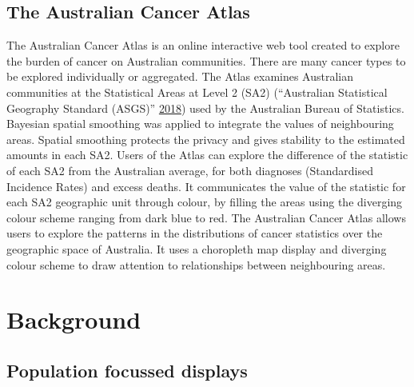 \documentclass[conference,final,]{IEEEtran}
\begin{document}
\hypertarget{the-australian-cancer-atlas}{%
\subsection{The Australian Cancer
Atlas}\label{the-australian-cancer-atlas}}

The Australian Cancer Atlas is an online interactive web tool created to
explore the burden of cancer on Australian communities. There are many
cancer types to be explored individually or aggregated. The Atlas
examines Australian communities at the Statistical Areas at Level 2
(SA2) (``Australian Statistical Geography Standard (ASGS)''
\protect\hyperlink{ref-abs2016}{2018}) used by the Australian Bureau of
Statistics. Bayesian spatial smoothing was applied to integrate the
values of neighbouring areas. Spatial smoothing protects the privacy and
gives stability to the estimated amounts in each SA2. Users of the Atlas
can explore the difference of the statistic of each SA2 from the
Australian average, for both diagnoses (Standardised Incidence Rates)
and excess deaths. It communicates the value of the statistic for each
SA2 geographic unit through colour, by filling the areas using the
diverging colour scheme ranging from dark blue to red. The Australian
Cancer Atlas allows users to explore the patterns in the distributions
of cancer statistics over the geographic space of Australia. It uses a
choropleth map display and diverging colour scheme to draw attention to
relationships between neighbouring areas.

\hypertarget{background}{%
\section{Background}\label{background}}

\hypertarget{population-focussed-displays}{%
\subsection{Population focussed
displays}\label{population-focussed-displays}}
\end{document}

